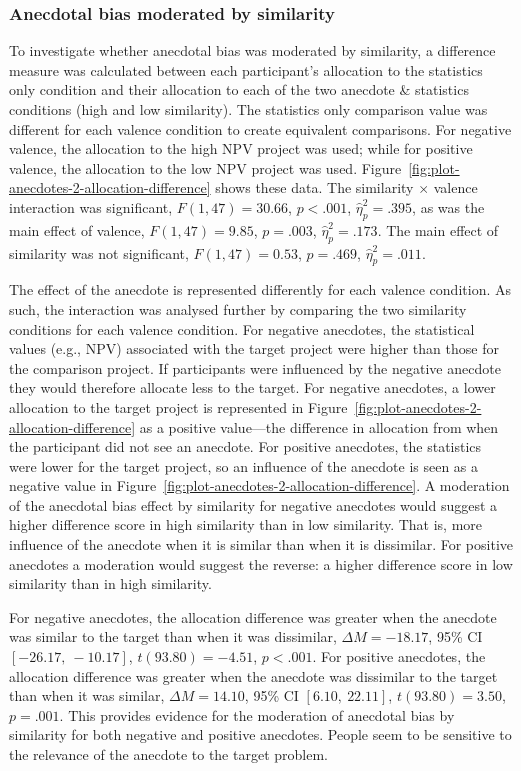 \documentclass[a4paper, nobind, dvipsnames]{templates/ociamthesis}
\theoremstyle{definition}
\theoremstyle{definition}
\theoremstyle{definition}
\theoremstyle{definition}
\theoremstyle{remark}
\begin{document}
\subsubsection{Anecdotal bias moderated by similarity}

To investigate whether anecdotal bias was moderated by similarity, a difference
measure was calculated between each participant's allocation to the statistics
only condition and their allocation to each of the two anecdote \& statistics
conditions (high and low similarity). The statistics only comparison value was
different for each valence condition to create equivalent comparisons. For
negative valence, the allocation to the high NPV project was used; while for
positive valence, the allocation to the low NPV project was used.
Figure~\ref{fig:plot-anecdotes-2-allocation-difference} shows these data. The
similarity \(\times\) valence interaction was significant,
\(F(1, 47) = 30.66\), \(p < .001\), \(\hat{\eta}^2_p = .395\), as was the
main effect of valence,
\(F(1, 47) = 9.85\), \(p = .003\), \(\hat{\eta}^2_p = .173\). The main effect of
similarity was not significant,
\(F(1, 47) = 0.53\), \(p = .469\), \(\hat{\eta}^2_p = .011\).

The effect of the anecdote is represented differently for each valence
condition. As such, the interaction was analysed further by comparing the two
similarity conditions for each valence condition. For negative anecdotes, the
statistical values (e.g., NPV) associated with the target project were higher
than those for the comparison project. If participants were influenced by the
negative anecdote they would therefore allocate less to the target. For negative
anecdotes, a lower allocation to the target project is represented in
Figure~\ref{fig:plot-anecdotes-2-allocation-difference} as a positive
value---the difference in allocation from when the participant did not see an
anecdote. For positive anecdotes, the statistics were lower for the target
project, so an influence of the anecdote is seen as a negative value in
Figure~\ref{fig:plot-anecdotes-2-allocation-difference}. A moderation of the
anecdotal bias effect by similarity for negative anecdotes would suggest a
higher difference score in high similarity than in low similarity. That is, more
influence of the anecdote when it is similar than when it is dissimilar. For
positive anecdotes a moderation would suggest the reverse: a higher difference
score in low similarity than in high similarity.

For negative anecdotes, the allocation difference
was greater when the anecdote was similar to the target than when it was
dissimilar, \(\Delta M = -18.17\), 95\% CI \([-26.17,~-10.17]\), \(t(93.80) = -4.51\), \(p < .001\). For
positive anecdotes, the allocation difference was greater when the anecdote was
dissimilar to the target than when it was similar,
\(\Delta M = 14.10\), 95\% CI \([6.10,~22.11]\), \(t(93.80) = 3.50\), \(p = .001\). This provides
evidence for the moderation of anecdotal bias by similarity for both negative
and positive anecdotes. People seem to be sensitive to the relevance of the
anecdote to the target problem.
\end{document}
